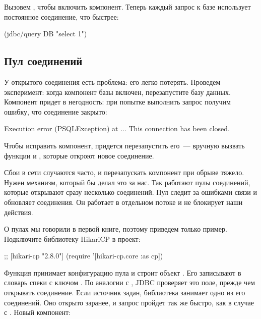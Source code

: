Вызовем , чтобы включить компонент. Теперь каждый запрос к базе использует постоянное соединение, что быстрее:

\begin{english}
  \begin{clojure}
(jdbc/query DB "select 1")
  \end{clojure}
\end{english}

\subsection{Пул соединений}


У открытого соединения есть проблема: его легко потерять. Проведем эксперимент: когда компонент базы включен, перезапустите базу данных. Компонент придет в негодность: при попытке выполнить запрос получим ошибку, что соединение закрыто:

\begin{english}
  \begin{text}
Execution error (PSQLException) at ...
This connection has been closed.
  \end{text}
\end{english}

Чтобы исправить компонент, придется перезапустить его~--- вручную вызвать функции  и , которые откроют новое соединение.

Сбои в сети случаются часто, и перезапускать компонент при обрыве тяжело. Нужен механизм, который бы делал это за нас. Так работают пулы соединений, которые открывают сразу несколько соединений. Пул следит за ошибками связи и обновляет соединения. Он работает в отдельном потоке и не блокирует наши действия.


О пулах мы говорили в первой книге, поэтому приведем только пример. Подключите библиотеку HikariCP в проект:

\begin{english}
  \begin{clojure}
;; [hikari-cp "2.8.0"]
(require '[hikari-cp.core :as cp])
  \end{clojure}
\end{english}


Функция  принимает конфигурацию пула и строит объект . Его записывают в словарь спеки с ключом . По аналогии с , JDBC проверяет это поле, прежде чем открывать соединение. Если источник задан, библиотека занимает одно из его соединений. Оно открыто заранее, и запрос пройдет так же быстро, как в случае с . Новый компонент:

